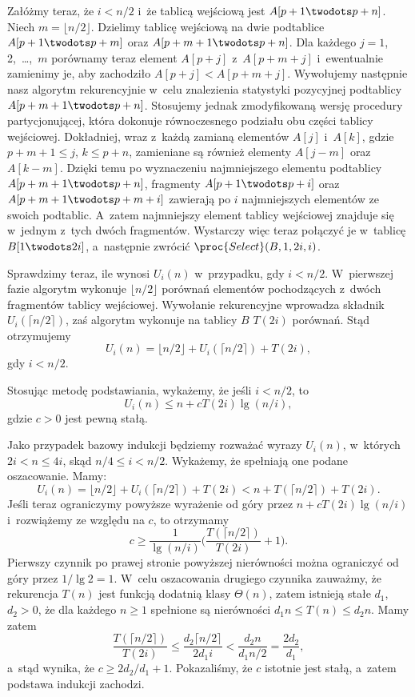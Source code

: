 Załóżmy teraz, że $i<n/2$ i~że tablicą wejściową jest $A[p+1\twodots p+n]$. Niech $m=\lfloor n/2\rfloor$. Dzielimy tablicę wejściową na dwie podtablice $A[p+1\twodots p+m]$ oraz $A[p+m+1\twodots p+n]$. Dla każdego $j=1$, 2,~\dots,~$m$ porównamy teraz element $A[p+j]$ z~$A[p+m+j]$ i~ewentualnie zamienimy je, aby zachodziło $A[p+j]<A[p+m+j]$. Wywołujemy następnie nasz algorytm rekurencyjnie w~celu znalezienia  statystyki pozycyjnej podtablicy $A[p+m+1\twodots p+n]$. Stosujemy jednak zmodyfikowaną wersję procedury partycjonującej, która dokonuje równoczesnego podziału obu części tablicy wejściowej. Dokładniej, wraz z~każdą zamianą elementów $A[j]$ i~$A[k]$, gdzie $p+m+1\le j$, $k\le p+n$, zamieniane są również elementy $A[j-m]$ oraz $A[k-m]$. Dzięki temu po wyznaczeniu  najmniejszego elementu podtablicy $A[p+m+1\twodots p+n]$, fragmenty $A[p+1\twodots p+i]$ oraz $A[p+m+1\twodots p+m+i]$ zawierają po $i$ najmniejszych elementów ze swoich podtablic. A~zatem  najmniejszy element tablicy wejściowej znajduje się w~jednym z~tych dwóch fragmentów. Wystarczy więc teraz połączyć je w~tablicę $B[1\twodots2i]$, a~następnie zwrócić $\proc{Select}(B,1,2i,i)$.

Sprawdzimy teraz, ile wynosi $U_i(n)$ w~przypadku, gdy $i<n/2$. W~pierwszej fazie algorytm wykonuje $\lfloor n/2\rfloor$ porównań elementów pochodzących z~dwóch fragmentów tablicy wejściowej. Wywołanie rekurencyjne wprowadza składnik $U_i(\lceil n/2\rceil)$, zaś algorytm  wykonuje na tablicy $B$ $T(2i)$ porównań. Stąd otrzymujemy
\[
    U_i(n) = \lfloor n/2\rfloor+U_i(\lceil n/2\rceil)+T(2i),
\]
gdy $i<n/2$.

\subproblem %
Stosując metodę podstawiania, wykażemy, że jeśli $i<n/2$, to
\[
	U_i(n) \le n+cT(2i)\lg(n/i),
\]
gdzie $c>0$ jest pewną stałą.

Jako przypadek bazowy indukcji będziemy rozważać wyrazy $U_i(n)$, w~których $2i<n\le4i$, skąd $n/4\le i<n/2$. Wykażemy, że spełniają one podane oszacowanie. Mamy:
\[
    U_i(n) = \lfloor n/2\rfloor+U_i(\lceil n/2\rceil)+T(2i) < n+T(\lceil n/2\rceil)+T(2i).
\]
Jeśli teraz ograniczymy powyższe wyrażenie od góry przez $n+cT(2i)\lg(n/i)$ i~rozwiążemy ze względu na $c$, to otrzymamy
\[
    c \ge \frac{1}{\lg(n/i)}\biggl(\frac{T(\lceil n/2\rceil)}{T(2i)}+1\biggr).
\]
Pierwszy czynnik po prawej stronie powyższej nierówności można ograniczyć od góry przez $1/\lg2=1$. W~celu oszacowania drugiego czynnika zauważmy, że rekurencja $T(n)$ jest funkcją dodatnią klasy $\Theta(n)$, zatem istnieją stałe $d_1$, $d_2>0$, że dla każdego $n\ge1$ spełnione są nierówności $d_1n\le T(n)\le d_2n$. Mamy zatem
\[
    \frac{T(\lceil n/2\rceil)}{T(2i)} \le \frac{d_2\lceil n/2\rceil}{2d_1i} < \frac{d_2n}{d_1n/2} = \frac{2d_2}{d_1},
\]
a~stąd wynika, że $c\ge2d_2/d_1+1$. Pokazaliśmy, że $c$ istotnie jest stałą, a~zatem podstawa indukcji zachodzi.

